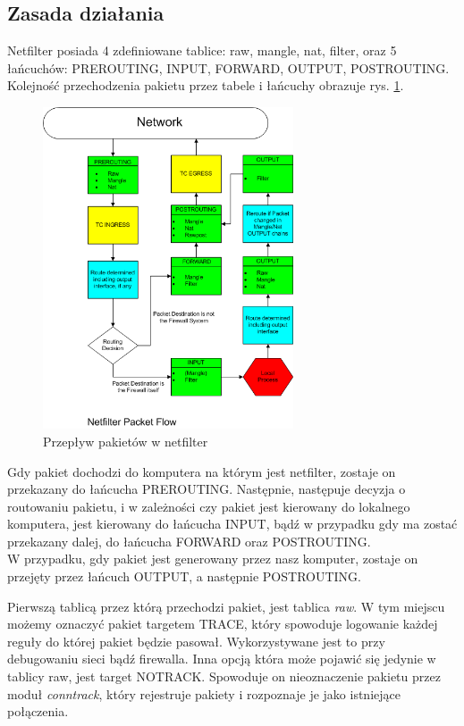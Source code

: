		\subsection{Zasada działania}
			Netfilter posiada 4 zdefiniowane tablice: raw, mangle, nat, filter, oraz 5 łańcuchów: PREROUTING, INPUT, FORWARD, OUTPUT, POSTROUTING.
			Kolejność przechodzenia pakietu przez tabele i łańcuchy obrazuje rys. \ref{fig:flowchart}.\\
			\begin{figure}[h]
				\centering
					\includegraphics[width=280px]{Netfilter.png}
					\caption{Przepływ pakietów w netfilter}
					\label{fig:flowchart}
			\end{figure}
			Gdy pakiet dochodzi do komputera na którym jest netfilter, zostaje on przekazany do łańcucha PREROUTING. Następnie, następuje decyzja o routowaniu pakietu, i w zależności czy pakiet jest kierowany do lokalnego komputera, jest kierowany do łańcucha INPUT, bądź w przypadku gdy ma zostać przekazany dalej, do łańcucha FORWARD oraz POSTROUTING.\\
			W przypadku, gdy pakiet jest generowany przez nasz komputer, zostaje on przejęty przez łańcuch OUTPUT, a następnie POSTROUTING.

			Pierwszą tablicą przez którą przechodzi pakiet, jest tablica \textit{raw}. W tym miejscu możemy oznaczyć pakiet targetem TRACE, który spowoduje logowanie każdej reguły do której pakiet będzie pasował. Wykorzystywane jest to przy debugowaniu sieci bądź firewalla.
			Inna opcją która może pojawić się jedynie w tablicy raw, jest target NOTRACK. Spowoduje on nieoznaczenie pakietu przez moduł \textit{conntrack}, który rejestruje pakiety i rozpoznaje je jako istniejące połączenia.

